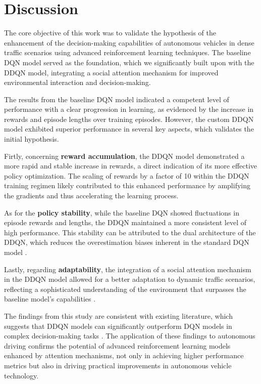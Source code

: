 \documentclass{article}
\begin{document}
\section{Discussion}

The core objective of this work was to validate the hypothesis of the enhancement of the decision-making capabilities of autonomous vehicles in dense traffic scenarios using advanced reinforcement learning techniques. The baseline DQN model served as the foundation, which we significantly built upon with the DDQN model, integrating a social attention mechanism for improved environmental interaction and decision-making.

The results from the baseline DQN model indicated a competent level of performance with a clear progression in learning, as evidenced by the increase in rewards and episode lengths over training episodes. However, the custom DDQN model exhibited superior performance in several key aspects, which validates the initial hypothesis.

Firtly, concerning \textbf{reward accumulation}, the DDQN model demonstrated a more rapid and stable increase in rewards, a direct indication of its more effective policy optimization. The scaling of rewards by a factor of 10 within the DDQN training regimen likely contributed to this enhanced performance by amplifying the gradients and thus accelerating the learning process.

As for the \textbf{policy stability}, while the baseline DQN showed fluctuations in episode rewards and lengths, the DDQN maintained a more consistent level of high performance. This stability can be attributed to the dual architecture of the DDQN, which reduces the overestimation biases inherent in the standard DQN model \citep{DBLP:journals/corr/HasseltGS15}.

Lastly, regarding \textbf{adaptability}, the integration of a social attention mechanism in the DDQN model allowed for a better adaptation to dynamic traffic scenarios, reflecting a sophisticated understanding of the environment that surpasses the baseline model's capabilities \citep{leurent2019social}.

The findings from this study are consistent with existing literature, which suggests that DDQN models can significantly outperform DQN models in complex decision-making tasks \citep{8500630}. The application of these findings to autonomous driving confirms the potential of advanced reinforcement learning models enhanced by attention mechanisms, not only in achieving higher performance metrics but also in driving practical improvements in autonomous vehicle technology.
\end{document}
